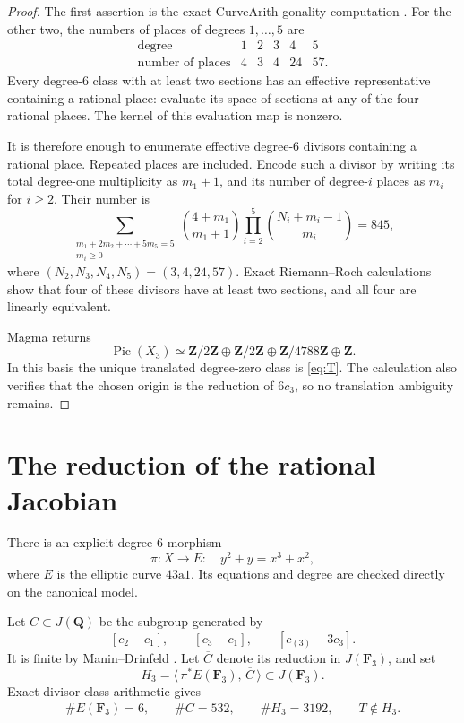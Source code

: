 \documentclass[11pt]{article}
\newcommand{\Q}{\mathbf Q}
\newcommand{\F}{\mathbf F}
\newcommand{\Pic}{\operatorname{Pic}}
\begin{document}
\begin{proof}
The first assertion is the exact CurveArith gonality computation
\cite{DerickxTerao}.  For the other two, the numbers of places of degrees
\(1,\ldots,5\) are
\[
\begin{array}{c|rrrrr}
\text{degree}&1&2&3&4&5\\ \hline
\text{number of places}&4&3&4&24&57.
\end{array}
\tag{1.3}\label{eq:place-counts}
\]
Every degree-\(6\) class with at least two sections has an effective
representative containing a rational place: evaluate its space of
sections at any of the four rational places.  The kernel of this
evaluation map is nonzero.

It is therefore enough to enumerate effective degree-\(6\) divisors
containing a rational place.  Repeated places are included.  Encode such
a divisor by writing its total degree-one multiplicity as \(m_1+1\), and
its number of degree-\(i\) places as \(m_i\) for \(i\geq2\).  Their number
is
\[
\sum_{\substack{m_1+2m_2+\cdots+5m_5=5\\m_i\geq0}}
 \binom{4+m_1}{m_1+1}
 \prod_{i=2}^{5}\binom{N_i+m_i-1}{m_i}
 =845,
\]
where \((N_2,N_3,N_4,N_5)=(3,4,24,57)\).
Exact Riemann--Roch calculations show that four of these divisors have
at least two sections, and all four are linearly equivalent.

Magma returns
\[
\Pic(X_3)\simeq
 \mathbf Z/2\mathbf Z\oplus\mathbf Z/2\mathbf Z
 \oplus\mathbf Z/4788\mathbf Z\oplus\mathbf Z.
\]
In this basis the unique translated degree-zero class is
\eqref{eq:T}.  The calculation also verifies that the chosen origin is
the reduction of \(6c_3\), so no translation ambiguity remains.
\end{proof}

\section{The reduction of the rational Jacobian}

There is an explicit degree-\(6\) morphism
\[
             \pi:X\longrightarrow
             E:\quad y^2+y=x^3+x^2,
\tag{2.1}\label{eq:pi}
\]
where \(E\) is the elliptic curve \(43\mathrm a1\).  Its equations and
degree are checked directly on the canonical model.

Let \(C\subset J(\Q)\) be the subgroup generated by
\[
      [c_2-c_1],\qquad[c_3-c_1],\qquad[c_{(3)}-3c_3].
\tag{2.2}\label{eq:Cgens}
\]
It is finite by Manin--Drinfeld \cite{Drinfeld}.  Let \(\overline C\)
denote its reduction in \(J(\F_3)\), and set
\[
 H_3=\langle\,\pi^*E(\F_3),\,\overline C\,\rangle
      \subset J(\F_3).
\tag{2.3}\label{eq:H3}
\]
Exact divisor-class arithmetic gives
\[
 \#E(\F_3)=6,\qquad
 \#\overline C=532,\qquad
 \#H_3=3192,\qquad
 T\notin H_3.
\tag{2.4}\label{eq:finite-membership}
\]
\end{document}
